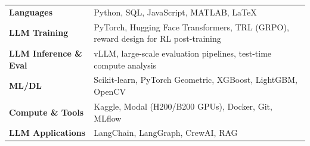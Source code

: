 \documentclass[10pt, a4paper]{article}
\begin{document}
\noindent
\begin{tabularx}{\textwidth}{@{}>{\bfseries}p{3.9cm} X@{}}
  Languages            & Python, SQL, JavaScript, MATLAB, \LaTeX \\[1pt]
  LLM Training         & PyTorch, Hugging Face Transformers, TRL (GRPO), reward design for RL post-training \\[1pt]
  LLM Inference \& Eval & vLLM, large-scale evaluation pipelines, test-time compute analysis \\[1pt]
  ML/DL                & Scikit-learn, PyTorch Geometric, XGBoost, LightGBM, OpenCV \\[1pt]
  Compute \& Tools      & Kaggle, Modal (H200/B200 GPUs), Docker, Git, MLflow \\[1pt]
  LLM Applications     & LangChain, LangGraph, CrewAI, RAG \\
\end{tabularx}
\end{document}
